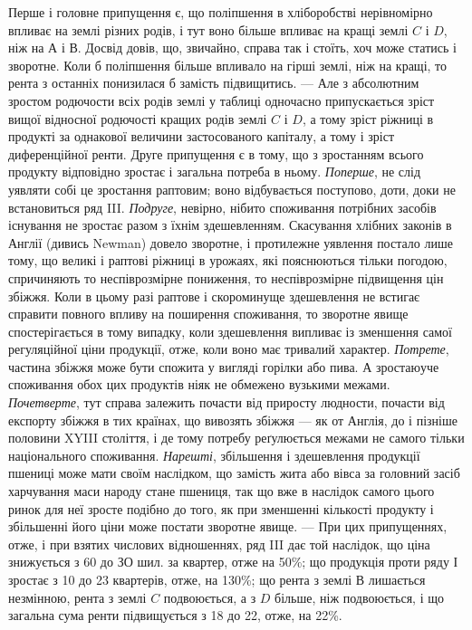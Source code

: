 
Перше і головне припущення є, що поліпшення в хліборобстві нерівномірно
впливає на землі різних родів, і тут воно більше впливає на кращі землі
$C$ і $D$, ніж на $А$ і $В$. Досвід довів, що, звичайно, справа так і стоїть, хоч може
статись і зворотне. Коли б поліпшення більше впливало на гірші землі, ніж на
кращі, то рента з останніх понизилася б замість підвищитись. — Але з абсолютним
зростом родючости всіх родів землі у таблиці одночасно припускається зріст
вищої відносної родючості кращих родів землі $C$ і $D$, а тому зріст ріжниці в продукті за однакової
величини застосованого капіталу, а тому і зріст диференційної ренти.
Друге припущення є в тому, що з зростанням всього продукту відповідно зростає і загальна потреба в
ньому. \emph{Поперше}, не слід уявляти собі це зростання раптовим; воно відбувається поступово, доти, доки
не встановиться ряд III. \emph{Подруге}, невірно, нібито споживання потрібних засобів існування не зростає разом з їхнім
здешевленням. Скасування хлібних законів в Англії (дивись Newman) довело зворотне, і протилежне
уявлення постало лише тому, що великі і раптові ріжниці в урожаях, які пояснюються тільки погодою,
спричиняють то неспіврозмірне пониження, то неспіврозмірне підвищення цін збіжжя.
Коли в цьому разі раптове і скороминуще здешевлення не встигає справити повного впливу на поширення
споживання, то зворотне явище спостерігається в тому випадку, коли здешевлення випливає із зменшення
самої регуляційної ціни продукції, отже, коли воно має тривалий характер. \emph{Потрете}, частина збіжжя
може бути спожита у вигляді горілки або пива. А зростаюуче споживання обох цих продуктів ніяк не
обмежено вузькими межами. \emph{Почетверте}, тут справа залежить почасти від приросту людности, почасти
від експорту збіжжя в тих країнах, що вивозять збіжжя — як от Англія, до і
пізніше половини XYIII століття, і де тому потребу реґулюється межами не самого
тільки національного споживання. \emph{Нарешті}, збільшення і здешевлення
продукції пшениці може мати своїм наслідком, що замість жита або вівса за
головний засіб харчування маси народу стане пшениця, так що вже в наслідок
самого цього ринок для неї зросте подібно до того, як при зменшенні кількості
продукту і збільшенні його ціни може постати зворотне явище. — При цих припущеннях, отже, і при
взятих числових відношеннях, ряд III дає той наслідок,
що ціна знижується з 60 до ЗО шил. за квартер, отже на 50\%; що продукція проти ряду І зростає з 10
до 23 квартерів, отже, на 130\%; що рента з землі $В$ лишається незмінною, рента з землі $C$
подвоюється, а з $D$ більше, ніж подвоюється, і що загальна сума ренти підвищується з 18 до 22, отже, на 22\%.

